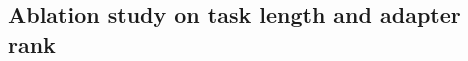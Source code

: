 \documentclass{article}
\theoremstyle{plain}
\theoremstyle{definition}
\theoremstyle{remark}
\begin{document}





\subsection{Ablation study on task length and adapter rank}
\label{sec:results-ablation}
\end{document}
